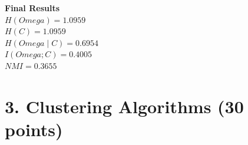 \documentclass[12pt]{article}
\begin{document}
\begin{enumerate}[label=(\alph*)]
    \textbf{Final Results} \\ 
    $H(Omega) = 1.0959$ \\
    $H(C) = 1.0959$ \\
    $H(Omega \mid C)  = 0.6954$ \\
    $I(Omega ; C)  = 0.4005$ \\
    $NMI = 0.3655$



\end{enumerate}

\newpage
\section*{3. Clustering Algorithms (30 points)}
\end{document}
